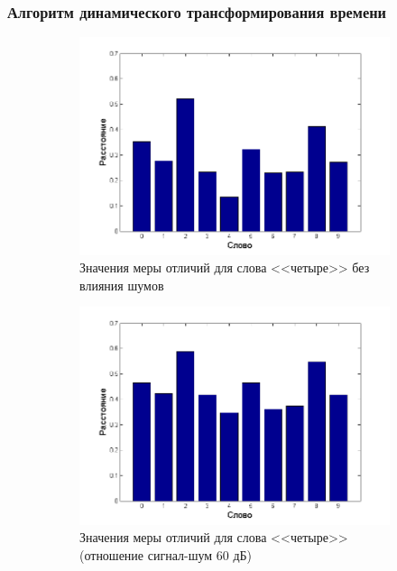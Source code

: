 \documentclass[slidestop, compress, mathserif, blackandwhite, utf8, serif, slidescentered]{beamer}
\begin{document}
\begin{frame}[plain]
	\frametitle{Алгоритм динамического трансформирования времени}
	\begin{figure}[h]
		\begin{subfigure}{0.32\textwidth}	
			\centering
			\includegraphics[width=\textwidth]{../clear_4.png}			
			\caption{Значения меры отличий для слова <<четыре>> без влияния шумов}
			\label{clear_4}
		\end{subfigure}
		\begin{subfigure}{0.32\textwidth}	
			\centering
			\includegraphics[width=\textwidth]{../60db_4.png}			
			\caption{Значения меры отличий для слова <<четыре>> (отношение сигнал-шум 60 дБ)}
			\label{60db_4}
		\end{subfigure}
		\begin{subfigure}{0.32\textwidth}	

\end{subfigure}
\end{figure}
\end{frame}
\end{document}
